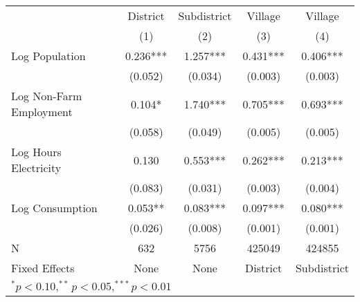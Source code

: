 \begin{tabular}{lcccc}
  \hline\hline
 & District & Subdistrict & Village & Village \\
 & (1) & (2) & (3) & (4) \\
  
  \hline
Log Population & 0.236*** & 1.257*** & 0.431*** & 0.406*** \\
               & (0.052)     & (0.034)     & (0.003)     & (0.003)     \\

Log Non-Farm Employment & 0.104* & 1.740*** & 0.705*** & 0.693*** \\
               & (0.058)     & (0.049)     & (0.005)     & (0.005)     \\

Log Hours Electricity  & 0.130 & 0.553*** & 0.262*** & 0.213*** \\
               & (0.083)     & (0.031)     & (0.003)     & (0.004)     \\

Log Consumption  & 0.053** & 0.083*** & 0.097*** & 0.080*** \\
               & (0.026)     & (0.008)     & (0.001)     & (0.001)     \\

\hline
N         & 632       & 5756     & 425049     & 424855                          \\
Fixed Effects & None & None & District & Subdistrict \\
\hline
\multicolumn{5}{l}{$^{*}p<0.10, ^{**}p<0.05, ^{***}p<0.01$} \\
\end{tabular}
